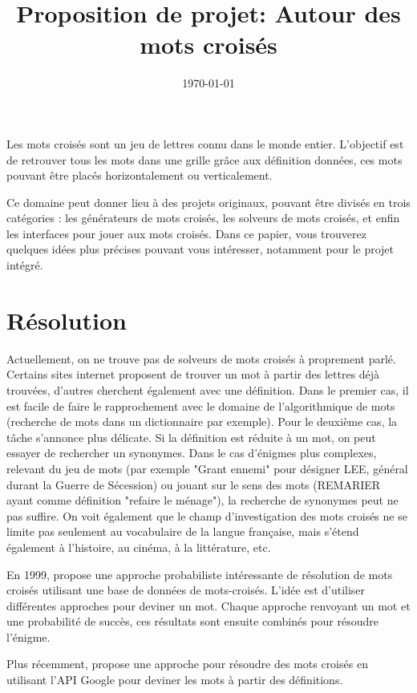 \documentclass{article}
\title{Proposition de projet: Autour des mots croisés}
\author{}
\date{\today}
\begin{document}
\maketitle

Les mots croisés sont un jeu de lettres connu dans le monde entier. L'objectif est de retrouver tous les mots dans une grille grâce aux définition données, ces mots pouvant être placés horizontalement ou verticalement.

Ce domaine peut donner lieu à des projets originaux, pouvant être divisés en trois catégories : les générateurs de mots croisés, les solveurs de mots croisés, et enfin les interfaces pour jouer aux mots croisés. Dans ce papier, vous trouverez quelques idées plus précises pouvant vous intéresser, notamment pour le projet intégré.

\section{Résolution}

Actuellement, on ne trouve pas de solveurs de mots croisés à proprement parlé. Certains sites internet proposent de trouver un mot à partir des lettres déjà trouvées, d'autres cherchent également avec une définition. Dans le premier cas, il est facile de faire le rapprochement avec le domaine de l'algorithmique de mots (recherche de mots dans un dictionnaire par exemple). Pour le deuxième cas, la tâche s'annonce plus délicate. Si la définition est réduite à un mot, on peut essayer de rechercher un synonymes. Dans le cas d'énigmes plus complexes, relevant du jeu de mots (par exemple "Grant ennemi" pour désigner LEE, général durant la Guerre de Sécession) ou jouant sur le sens des mots (REMARIER ayant comme définition "refaire le ménage"), la recherche de synonymes peut ne pas suffire. On voit également que le champ d'investigation des mots croisés ne se limite pas seulement au vocabulaire de la langue française, mais s'étend également à l'histoire, au cinéma, à la littérature, etc.

En 1999, \cite{proverb} propose une approche probabiliste intéressante de résolution de mots croisés utilisant une base de données de mots-croisés. L'idée est d'utiliser différentes approches pour deviner un mot. Chaque approche renvoyant un mot et une probabilité de succès, ces résultats sont ensuite combinés pour résoudre l'énigme.

Plus récemment, \cite{GCV} propose une approche pour résoudre des mots croisés en utilisant l'API Google pour deviner les mots à partir des définitions.
\end{document}
